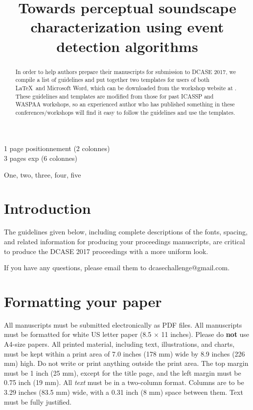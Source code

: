 \documentclass{article}
\title{Towards perceptual soundscape characterization using event detection algorithms}
\begin{document}
\ninept
\maketitle

1 page positionnement (2 colonnes)\\
3 pages exp (6 colonnes)

\clearpage
\begin{sloppy}

\begin{abstract}
In order to help authors prepare their manuscripts for submission to DCASE 2017, we compile a list of guidelines and put together two templates for users of both \LaTeX\ and Microsoft Word, which can be downloaded from the workshop website at \cite{dcase2017web}. These guidelines and templates are modified from those for past ICASSP and WASPAA workshops, so an experienced author who has published something in these conferences/workshops will find it easy to follow the guidelines and use the templates.
\end{abstract}

\begin{keywords}
One, two, three, four, five
\end{keywords}


\section{Introduction}
\label{sec:intro}

The guidelines given below, including complete descriptions of the fonts, spacing, and related information for producing your proceedings manuscripts, are critical to produce the DCASE 2017 proceedings with a more uniform look. 

If you have any questions, please email them to dcasechallenge@gmail.com.


\section{Formatting your paper}
\label{sec:format}

All manuscripts must be submitted electronically as PDF files. All manuscripts must be formatted for white US letter paper (8.5 $\times$ 11 inches). Please do {\bf not} use A4-size papers. All printed material, including text, illustrations, and charts, must be kept within a print area of 7.0 inches (178 mm) wide by 8.9 inches (226 mm) high. Do not write or print anything outside the print area. The top margin must be 1 inch (25 mm), except for the title page, and the left margin must be 0.75 inch (19 mm).  All {\it text} must be in a two-column format. Columns are to be 3.29 inches (83.5 mm) wide, with a 0.31 inch (8 mm) space between them. Text must be fully justified. 


\end{sloppy}
\end{document}
